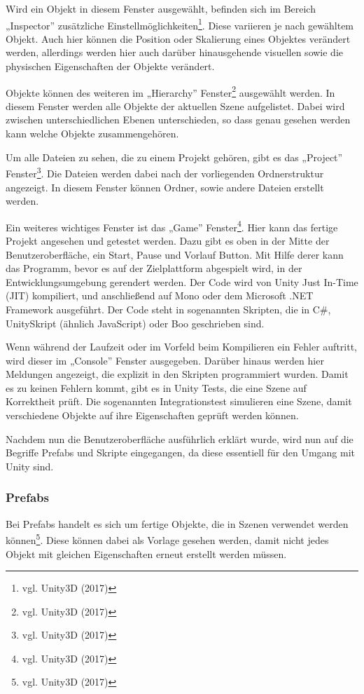 		Wird ein Objekt in diesem Fenster ausgewählt, befinden sich im Bereich „Inspector” zusätzliche Einstellmöglichkeiten\footnote{vgl. Unity3D \cite{unity3} (2017)}. Diese variieren je nach gewähltem Objekt. Auch hier können die Position oder Skalierung eines Objektes verändert werden, allerdings werden hier auch darüber hinausgehende visuellen sowie die physischen Eigenschaften der Objekte verändert.
	
		Objekte können des weiteren im „Hierarchy” Fenster\footnote{vgl. Unity3D \cite{unity4} (2017)} ausgewählt werden. In diesem Fenster werden alle Objekte der aktuellen Szene aufgelistet. Dabei wird zwischen unterschiedlichen Ebenen unterschieden, so dass genau gesehen werden kann welche Objekte zusammengehören. 
	
		Um alle Dateien zu sehen, die zu einem Projekt gehören, gibt es das „Project” Fenster\footnote{vgl. Unity3D \cite{unity5} (2017)}. Die Dateien werden dabei nach der vorliegenden Ordnerstruktur angezeigt. In diesem Fenster können Ordner, sowie andere Dateien erstellt werden.
	
		Ein weiteres wichtiges Fenster ist das „Game” Fenster\footnote{vgl. Unity3D \cite{unity6} (2017)}. Hier kann das fertige Projekt angesehen und getestet werden. Dazu gibt es oben in der Mitte der Benutzeroberfläche, ein Start, Pause und Vorlauf Button. Mit Hilfe derer kann das Programm, bevor es auf der Zielplattform abgespielt wird, in der Entwicklungsumgebung gerendert werden. Der Code wird von Unity Just In-Time (\ac{JIT}) kompiliert, und anschließend auf Mono oder dem Microsoft .NET Framework ausgeführt. Der Code steht in sogenannten Skripten, die in C\#, UnitySkript (ähnlich JavaScript) oder Boo geschrieben sind.
	
		Wenn während der Laufzeit oder im Vorfeld beim Kompilieren ein Fehler auftritt, wird dieser im „Console” Fenster ausgegeben. Darüber hinaus werden hier Meldungen angezeigt, die explizit in den Skripten programmiert wurden. Damit es zu keinen Fehlern kommt, gibt es in Unity Tests, die eine Szene auf Korrektheit prüft. Die sogenannten Integrationstest simulieren eine Szene, damit verschiedene Objekte auf ihre Eigenschaften geprüft werden können. 
	
		Nachdem nun die Benutzeroberfläche ausführlich erklärt wurde, wird nun auf die Begriffe Prefabs und Skripte eingegangen, da diese essentiell für den Umgang mit Unity sind.
	
		\subsubsection{Prefabs}
			Bei Prefabs handelt es sich um fertige Objekte, die in Szenen verwendet werden können\footnote{vgl. Unity3D \cite{unity7} (2017)}. Diese können dabei als Vorlage gesehen werden, damit nicht jedes Objekt mit gleichen Eigenschaften erneut erstellt werden müssen. 
			
